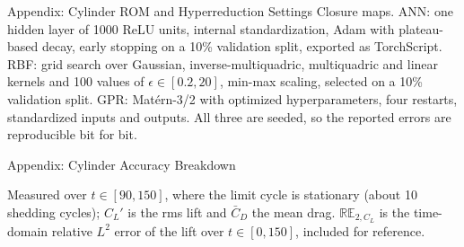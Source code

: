 \documentclass[aspectratio=169]{beamer}
\begin{document}
\begin{frame}{Appendix: Cylinder ROM and Hyperreduction Settings}
\vspace{0.4em}
{\tiny Closure maps. ANN: one hidden layer of 1000 ReLU units, internal standardization,
Adam with plateau-based decay, early stopping on a 10\% validation split, exported as
TorchScript. RBF: grid search over Gaussian, inverse-multiquadric, multiquadric and
linear kernels and 100 values of $\epsilon\in[0.2,20]$, min-max scaling, selected on a
10\% validation split. GPR: Mat\'ern-3/2 with optimized hyperparameters, four restarts,
standardized inputs and outputs. All three are seeded, so the reported errors are
reproducible bit for bit.}
\end{frame}

\begin{frame}{Appendix: Cylinder Accuracy Breakdown}
\scriptsize
\centering
{}
\vspace{0.25em}

{\tiny Measured over $t\in[90,150]$, where the limit cycle is stationary (about 10 shedding cycles); $C_L'$ is the rms lift and $\bar{C}_D$ the mean drag. $\mathbb{RE}_{2,C_L}$ is the time-domain relative $L^2$ error of the lift over $t\in[0,150]$, included for reference.}


\end{frame}
\end{document}
